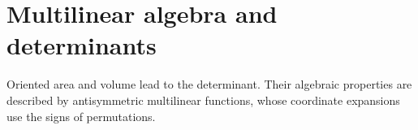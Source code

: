 \chapter{Multilinear algebra and determinants}
\label{ch:linear-algebra-i:determinants}

Oriented area and volume lead to the determinant. Their algebraic properties
are described by antisymmetric multilinear functions, whose coordinate
expansions use the signs of permutations.





